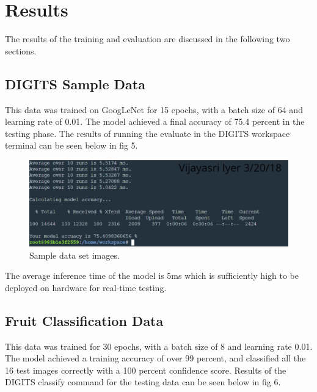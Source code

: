 \documentclass[10pt,journal,compsoc]{IEEEtran}
\begin{document}
\section{Results}
The results of the training and evaluation are discussed in the following two sections.

\subsection{DIGITS Sample Data}
This data was trained on GoogLeNet for 15 epochs, with a batch size of 64 and learning rate of 0.01. The model achieved a final accuracy of 75.4 percent in the testing phase. The results of running the evaluate in the DIGITS workspace terminal can be seen below in fig 5.

\begin{figure}[tbhp]
      \centering
      \includegraphics[width=\linewidth]{res.png}
      \caption{Sample data set images.}
      \label{fig:robot1}
\end{figure}

The average inference time of the model is 5ms which is sufficiently high to be deployed on hardware for real-time testing.


\subsection{Fruit Classification Data}
This data was trained for 30 epochs, with a batch size of 8 and learning rate 0.01. The model achieved a training accuracy of over 99 percent, and classified all the 16 test images correctly with a 100 percent confidence score. Results of the DIGITS classify command for the testing data can be seen below in fig 6.
\end{document}
